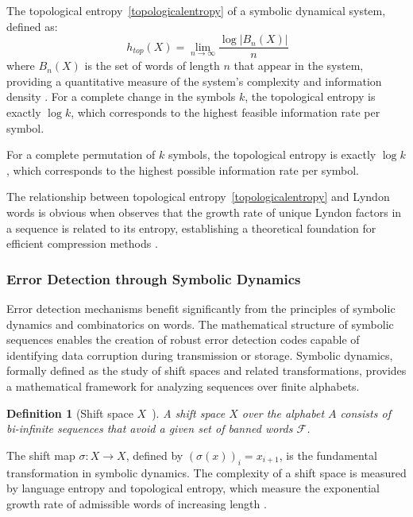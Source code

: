 \documentclass[12pt,a4paper]{article}
\newtheorem{definition}{Definition}
\begin{document}
The topological entropy~\eqref{topologicalentropy} of a symbolic dynamical system, defined as: 
\begin{equation}~\label{topologicalentropy}
h_{top}(X) = \lim_{n \to \infty} \frac{\log|B_n(X)|}{n}
\end{equation}
where $B_n(X)$ is the set of words of length $n$ that appear in the system, providing a quantitative measure of the system's complexity and information density \cite{Adler}.  For a complete change in the symbols $k$, the topological entropy is exactly $\log k$, which corresponds to the highest feasible information rate per symbol.  

For a complete permutation of $k$ symbols, the topological entropy is exactly $\log k$, which corresponds to the highest possible information rate per symbol.


The relationship between topological entropy~\eqref{topologicalentropy} and Lyndon words is obvious when observes that the growth rate of unique Lyndon factors in a sequence is related to its entropy, establishing a theoretical foundation for efficient compression methods \cite{LothaireM}.
\subsubsection{Error Detection through Symbolic Dynamics}

Error detection mechanisms benefit significantly from the principles of symbolic dynamics and combinatorics on words. The mathematical structure of symbolic sequences enables the creation of robust error detection codes capable of identifying data corruption during transmission or storage. Symbolic dynamics, formally defined as the study of shift spaces and related transformations, provides a mathematical framework for analyzing sequences over finite alphabets.
 \begin{definition}[Shift space $X$~\cite{Lind}]
A shift space $X$ over the alphabet $A$ consists of bi-infinite sequences that avoid a given set of banned words $\mathcal{F}$.
 \end{definition}
The shift map $\sigma: X \rightarrow X$, defined by $(\sigma(x))_i = x_{i+1}$, is the fundamental transformation in symbolic dynamics. The complexity of a shift space is measured by language entropy and topological entropy, which measure the exponential growth rate of admissible words of increasing length \cite{Adler}.
\end{document}
